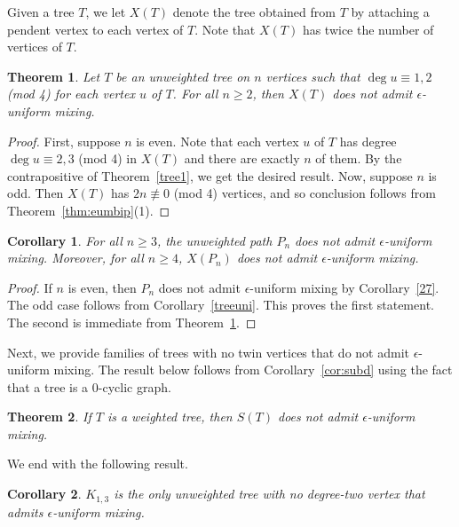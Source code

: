 \documentclass[11pt]{article}
\newtheorem{theorem}{Theorem}
\newtheorem{corollary}{Corollary}
\begin{document}
Given a tree $T$, we let $X(T)$ denote the tree obtained from $T$ by attaching a pendent vertex to each vertex of $T$. Note that $X(T)$ has twice the number of vertices of $T$. 

\begin{theorem}
\label{X(T)}
Let $T$ be an unweighted tree on $n$ vertices such that $\operatorname{deg}u\equiv 1,2$ (mod 4) for each vertex $u$ of $T$. For all $n\geq 2$, then $X(T)$ does not admit $\epsilon$-uniform mixing.
\end{theorem}

\begin{proof}
First, suppose $n$ is even. Note that each vertex $u$ of $T$ has degree $\operatorname{deg}u\equiv 2,3$ (mod 4) in $X(T)$ and there are exactly $n$ of them. By the contrapositive of Theorem~\ref{tree1}, we get the desired result. Now, suppose $n$ is odd. Then $X(T)$ has $2n\not\equiv 0$ (mod 4) vertices, and so conclusion follows from Theorem~\ref{thm:eumbip}(1).
\end{proof}

\begin{corollary}
\label{path}
For all $n\geq 3$, the unweighted path $P_n$ does not admit $\epsilon$-uniform mixing. Moreover, for all $n\geq 4$, $X(P_n)$ does not admit $\epsilon$-uniform mixing.
\end{corollary} 

\begin{proof}
If $n$ is even, then $P_n$ does not admit $\epsilon$-uniform mixing by Corollary~\ref{27}. The odd case follows from Corollary~\ref{treeuni}. This proves the first statement. The second is immediate from Theorem~\ref{X(T)}.
\end{proof}

Next, we provide families of trees with no twin vertices that do not admit $\epsilon$-uniform mixing. The result below follows from Corollary~\ref{cor:subd} using the fact that a tree is a $0$-cyclic graph.

\begin{theorem}
\label{thm:subdtree}
If $T$ is a weighted tree, then $S(T)$ does not admit $\epsilon$-uniform mixing.
\end{theorem}


We end with the following result.

\begin{corollary}
\label{k13}
$K_{1,3}$ is the only unweighted tree with no degree-two vertex that admits $\epsilon$-uniform mixing.
\end{corollary}
\end{document}
